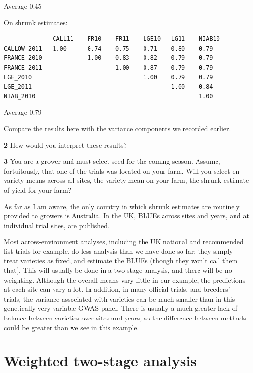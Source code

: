 \documentclass[
]{book}
\makeatletter
\newenvironment{kframe}{%
\medskip{}
\setlength{\fboxsep}{.8em}
 \def\at@end@of@kframe{}%
 \ifinner\ifhmode%
  \def\at@end@of@kframe{\end{minipage}}%
  \begin{minipage}{\columnwidth}%
 \fi\fi%
 \def\FrameCommand##1{\hskip\@totalleftmargin \hskip-\fboxsep
 \colorbox{shadecolor}{##1}\hskip-\fboxsep
     \hskip-\linewidth \hskip-\@totalleftmargin \hskip\columnwidth}%
 \MakeFramed {\advance\hsize-\width
   \@totalleftmargin\z@ \linewidth\hsize
   \@setminipage}}%
 {\par\unskip\endMakeFramed%
 \at@end@of@kframe}
\newenvironment{rmdblock}[1]
  {
  \begin{itemize}
  \renewcommand{\labelitemi}{
    \raisebox{-.7\height}[0pt][0pt]{
      {\setkeys{Gin}{width=3em,keepaspectratio}\texttt{[image: images/\#1]}}
    }
  }
  \setlength{\fboxsep}{1em}
  \begin{kframe}
  \item
  }
  {
  \end{kframe}
  \end{itemize}
  }
\newenvironment{rmdquiz}
  {\begin{rmdblock}{quiz}}
  {\end{rmdblock}}
\makeatother
\begin{document}
Average 0.45

On shrunk estimates:

\begin{verbatim}
              CALL11    FR10    FR11    LGE10   LG11    NIAB10
CALLOW_2011   1.00      0.74    0.75    0.71    0.80    0.79
FRANCE_2010             1.00    0.83    0.82    0.79    0.79
FRANCE_2011                     1.00    0.87    0.79    0.79
LGE_2010                                1.00    0.79    0.79
LGE_2011                                        1.00    0.84
NIAB_2010                                               1.00
\end{verbatim}

Average 0.79

Compare the results here with the variance components we recorded earlier.

\begin{rmdquiz}
\textbf{2} How would you interpret these results?
\end{rmdquiz}

\begin{rmdquiz}
\textbf{3} You are a grower and must select seed for the coming season. Assume, fortuitously, that one of the trials was located on your farm. Will you select on variety means across all sites, the variety mean on your farm, the shrunk estimate of yield for your farm?
\end{rmdquiz}

As far as I am aware, the only country in which shrunk estimates are routinely provided to growers is Australia. In the UK, BLUEs across sites and years, and at individual trial sites, are published.

Most across-environment analyses, including the UK national and recommended list trials for example, do less analysis than we have done so far: they simply treat varieties as fixed, and estimate the BLUEs (though they won't call them that). This will usually be done in a two-stage analysis, and there will be no weighting. Although the overall means vary little in our example, the predictions at each site can vary a lot. In addition, in many official trials, and breeders' trials, the variance associated with varieties can be much smaller than in this genetically very variable GWAS panel. There is usually a much greater lack of balance between varieties over sites and years, so the difference between methods could be greater than we see in this example.

\hypertarget{weighted-two-stage-analysis}{%
\section{Weighted two-stage analysis}\label{weighted-two-stage-analysis}}
\end{document}

